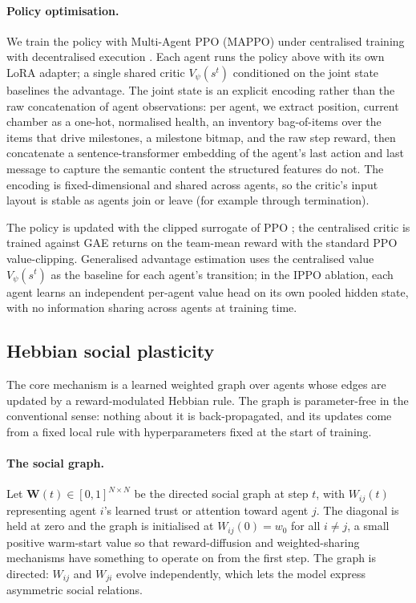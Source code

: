 \paragraph{Policy optimisation.}
We train the policy with Multi-Agent PPO (MAPPO) \cite{yu2022surprising} under centralised training with decentralised execution \cite{amato2015scalable}. Each agent runs the policy above with its own LoRA adapter; a single shared critic $V_\psi(s^t)$ conditioned on the joint state baselines the advantage. The joint state is an explicit encoding rather than the raw concatenation of agent observations: per agent, we extract position, current chamber as a one-hot, normalised health, an inventory bag-of-items over the items that drive milestones, a milestone bitmap, and the raw step reward, then concatenate a sentence-transformer embedding of the agent's last action and last message to capture the semantic content the structured features do not. The encoding is fixed-dimensional and shared across agents, so the critic's input layout is stable as agents join or leave (for example through termination).

The policy is updated with the clipped surrogate of PPO \cite{yu2022surprising}; the centralised critic is trained against GAE \cite{} returns on the team-mean reward with the standard PPO value-clipping. Generalised advantage estimation uses the centralised value $V_\psi(s^t)$ as the baseline for each agent's transition; in the IPPO ablation, each agent learns an independent per-agent value head on its own pooled hidden state, with no information sharing across agents at training time.

\subsection{Hebbian social plasticity}
\label{sec:hebbian_method}

The core mechanism is a learned weighted graph over agents whose edges are updated by a reward-modulated Hebbian rule. The graph is parameter-free in the conventional sense: nothing about it is back-propagated, and its updates come from a fixed local rule with hyperparameters fixed at the start of training.

\paragraph{The social graph.}
Let $\mathbf{W}(t) \in [0, 1]^{N \times N}$ be the directed social graph at step $t$, with $W_{ij}(t)$ representing agent $i$'s learned trust or attention toward agent $j$. The diagonal is held at zero and the graph is initialised at $W_{ij}(0) = w_0$ for all $i \neq j$, a small positive warm-start value so that reward-diffusion and weighted-sharing mechanisms have something to operate on from the first step. The graph is directed: $W_{ij}$ and $W_{ji}$ evolve independently, which lets the model express asymmetric social relations.

